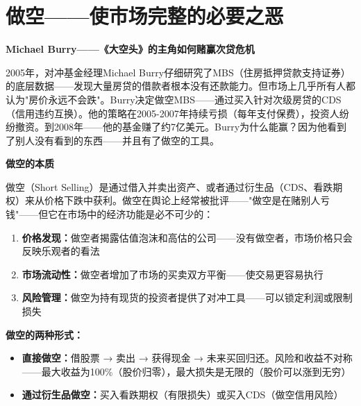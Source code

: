 \documentclass[a4paper,11pt]{ctexbook}
\begin{document}

\newpage
\chapter{做空——使市场完整的必要之恶}

\begin{scenario}
\textbf{Michael Burry——《大空头》的主角如何赌赢次贷危机}

2005年，对冲基金经理Michael Burry仔细研究了MBS（住房抵押贷款支持证券）的底层数据——发现大量房贷的借款者根本没有还款能力。但市场上几乎所有人都认为"房价永远不会跌"。Burry决定做空MBS——通过买入针对次级房贷的CDS（信用违约互换）。他的策略在2005-2007年持续亏损（每年支付保费），投资人纷纷撤资。到2008年——他的基金赚了约7亿美元。Burry为什么能赢？因为他看到了别人没有看到的东西——并且有了做空的工具。
\end{scenario}

\begin{qualitative}
\textbf{做空的本质}

做空（Short Selling）是通过借入并卖出资产、或者通过衍生品（CDS、看跌期权）来从价格下跌中获利。做空在舆论上经常被批评——"做空是在赌别人亏钱"——但它在市场中的经济功能是必不可少的：

\begin{enumerate}
  \item \textbf{价格发现：}做空者揭露估值泡沫和高估的公司——没有做空者，市场价格只会反映乐观者的看法
  \item \textbf{市场流动性：}做空者增加了市场的买卖双方平衡——使交易更容易执行
  \item \textbf{风险管理：}做空为持有现货的投资者提供了对冲工具——可以锁定利润或限制损失
\end{enumerate}

\textbf{做空的两种形式：}
\begin{itemize}
  \item \textbf{直接做空：}借股票 → 卖出 → 获得现金 → 未来买回归还。风险和收益不对称——最大收益为100\%（股价归零），最大损失是无限的（股价可以涨到无穷）
  \item \textbf{通过衍生品做空：}买入看跌期权（有限损失）或买入CDS（做空信用风险）
\end{itemize}
\end{qualitative}
\end{document}
